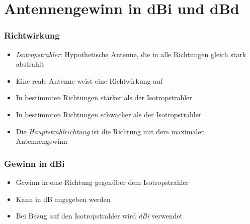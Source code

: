 
\section{Antennengewinn in dBi und dBd}
\label{section:antennengewinn}
\begin{frame}%

\frametitle{Richtwirkung}
\begin{itemize}
  \item \emph{Isotropstrahler}: Hypothetische Antenne, die in alle Richtungen gleich stark abstrahlt
  \item Eine reale Antenne weist eine Richtwirkung auf
  \item In bestimmten Richtungen stärker als der Isotropstrahler
  \item In bestimmten Richtungen schwächer als der Isotropstrahler
  \item Die \emph{Hauptstrahlrichtung} ist die Richtung mit dem maximalen Antennengewinn
  \end{itemize}
\end{frame}

\begin{frame}
\frametitle{Gewinn in dBi}
\begin{itemize}
  \item Gewinn in eine Richtung gegenüber dem Isotropstrahler
  \item Kann in dB angegeben werden
  \item Bei Bezug auf den Isotropstrahler wird \emph{dBi} verwendet
  \end{itemize}
\end{frame}

\begin{frame}
\end{frame}

